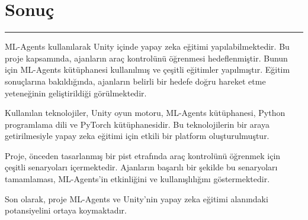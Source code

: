 \documentclass{article}
\begin{document}
\newpage

\section{Sonuç}
\rule{\textwidth}{0.5pt}
 \par ML-Agents kullanılarak Unity içinde yapay zeka eğitimi yapılabilmektedir. Bu proje kapsamında, ajanların araç kontrolünü öğrenmesi hedeflenmiştir. Bunun için ML-Agents kütüphanesi kullanılmış ve çeşitli eğitimler yapılmıştır. Eğitim sonuçlarına bakıldığında, ajanların belirli bir hedefe doğru hareket etme yeteneğinin geliştirildiği görülmektedir.\\[5pt]

\par Kullanılan teknolojiler, Unity oyun motoru, ML-Agents kütüphanesi, Python programlama dili ve PyTorch kütüphanesidir. Bu teknolojilerin bir araya getirilmesiyle yapay zeka eğitimi için etkili bir platform oluşturulmuştur.\\[5pt]

\par Proje, önceden tasarlanmış bir pist etrafında araç kontrolünü öğrenmek için çeşitli senaryoları içermektedir. Ajanların başarılı bir şekilde bu senaryoları tamamlaması, ML-Agents'in etkinliğini ve kullanışlılığını göstermektedir.\\[5pt]

\par Son olarak, proje ML-Agents ve Unity'nin yapay zeka eğitimi alanındaki potansiyelini ortaya koymaktadır.\\[5pt]
\par 

\newpage



\end{document}
